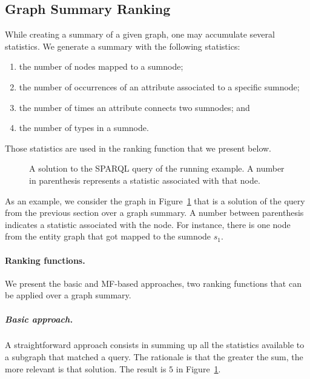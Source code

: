 \subsection{Graph Summary Ranking}
\label{sec:graph-summary-ranking}

While creating a summary of a given graph, one may accumulate several statistics. We generate a summary with the following statistics:
\begin{enumerate}
	\item the number of nodes mapped to a sumnode;
	\item the number of occurrences of an attribute associated to a specific sumnode;
	\item the number of times an attribute connects two sumnodes; and
	\item the number of types in a sumnode.
\end{enumerate}
Those statistics are used in the ranking function that we present below.

\begin{figure}
	\centering
	\resizebox{.6\textwidth}{!}{
		
	}
	\caption{A solution to the SPARQL query of the running example. A number in parenthesis represents a statistic associated with that node.}
	\label{fig:sparql-solution}
\end{figure}

As an example, we consider the graph in Figure~\ref{fig:sparql-solution} that is a solution of the query from the previous section over a graph summary. A number between parenthesis indicates a statistic associated with the node. For instance, there is one node from the entity graph that got mapped to the sumnode $s_1$.

\paragraph{Ranking functions.}

We present the basic and MF-based approaches, two ranking functions that can be applied over a graph summary.

\subparagraph{Basic approach.}

A straightforward approach consists in summing up all the statistics available to a subgraph that matched a query. The rationale is that the greater the sum, the more relevant is that solution. The result is $5$ in Figure~\ref{fig:sparql-solution}.


